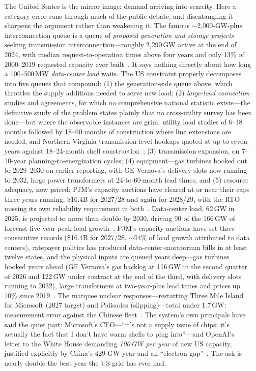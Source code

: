

The United States is the mirror image: demand arriving into scarcity. Here a category error runs through much of the public debate, and disentangling it sharpens the argument rather than weakening it. The famous $\sim$2,000-GW-plus interconnection queue is a queue of \emph{proposed generation and storage projects} seeking transmission interconnection---roughly 2,290\,GW active at the end of 2024, with median request-to-operation times above four years and only 13\% of 2000--2019 requested capacity ever built~\cite{lbl-queued}. It says nothing directly about how long a 100--500\,MW \emph{data-center load} waits. The US constraint properly decomposes into five queues that compound: (1) the generation-side queue above, which throttles the supply additions needed to serve new load; (2) \emph{large-load connection} studies and agreements, for which no comprehensive national statistic exists---the definitive study of the problem states plainly that no cross-utility survey has been done---but where the observable instances are grim: utility load studies of 6--18 months followed by 18--60 months of construction where line extensions are needed, and Northern Virginia transmission-level hookups quoted at up to seven years against 18--24-month shell construction~\cite{lbl-speed,dominion-wait}; (3) transmission expansion, on 7--10-year planning-to-energization cycles; (4) equipment---gas turbines booked out to 2029--2030 on earlier reporting, with GE Vernova's delivery slots now running to 2032, large power transformers at 24-to-60-month lead times; and (5) resource adequacy, now priced: PJM's capacity auctions have cleared at or near their caps three years running, \$16.4B for 2027/28 and again for 2028/29, with the RTO missing its own reliability requirement in both~\cite{gas-turbines,transformers,pjm,pjm-2829}. Data-center load, 62\,GW in 2025, is projected to more than double by 2030, driving 90 of the 166\,GW of forecast five-year peak-load growth~\cite{sp-dc,grid-strategies}; PJM's capacity auctions have set three consecutive records (\$16.4B for 2027/28, $\sim$94\% of load growth attributed to data centers), ratepayer politics has produced data-center-moratorium bills in at least twelve states, and the physical inputs are queued years deep---gas turbines booked years ahead (GE Vernova's gas backlog at 116\,GW in the second quarter of 2026 and 122\,GW under contract at the end of the third, with delivery slots running to 2032), large transformers at two-year-plus lead times and prices up 70\% since 2019~\cite{pjm,moratoria,gas-turbines,cap-gev-q3,transformers}. The marquee nuclear responses---restarting Three Mile Island for Microsoft (2027 target) and Palisades (slipping)---total under 1.7\,GW: measurement error against the Chinese fleet~\cite{tmi-palisades}. The system's own principals have said the quiet part: Microsoft's CEO---``it's not a supply issue of chips; it's actually the fact that I don't have warm shells to plug into''---and OpenAI's letter to the White House demanding \emph{100\,GW per year} of new US capacity, justified explicitly by China's 429-GW year and an ``electron gap''~\cite{nadella-power,openai-100gw}. The ask is nearly double the best year the US grid has ever had.

